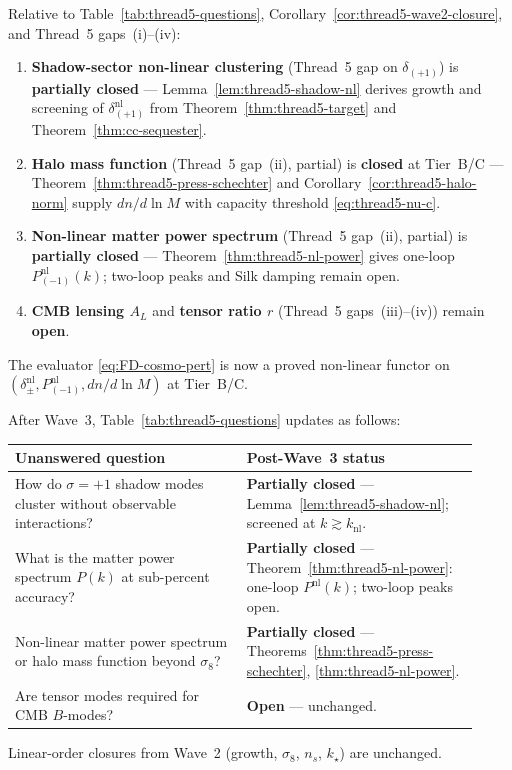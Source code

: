 \begin{corollary}
\label{cor:thread5-wave3-closure}
Relative to Table~\ref{tab:thread5-questions}, Corollary~\ref{cor:thread5-wave2-closure},
and Thread~5 gaps~(i)--(iv):
\begin{enumerate}[label=(\roman*),leftmargin=*]
  \item \textbf{Shadow-sector non-linear clustering}
    (Thread~5 gap on $\delta_{(+1)}$) is \textbf{partially closed} ---
    Lemma~\ref{lem:thread5-shadow-nl} derives growth and screening of
    $\delta_{(+1)}^{\mathrm{nl}}$ from Theorem~\ref{thm:thread5-target} and
    Theorem~\ref{thm:cc-sequester}.
  \item \textbf{Halo mass function}
    (Thread~5 gap~(ii), partial) is \textbf{closed} at Tier~B/C ---
    Theorem~\ref{thm:thread5-press-schechter} and
    Corollary~\ref{cor:thread5-halo-norm} supply $dn/d\ln M$ with capacity
    threshold \eqref{eq:thread5-nu-c}.
  \item \textbf{Non-linear matter power spectrum}
    (Thread~5 gap~(ii), partial) is \textbf{partially closed} ---
    Theorem~\ref{thm:thread5-nl-power} gives one-loop
    $P_{(-1)}^{\mathrm{nl}}(k)$; two-loop peaks and Silk damping remain open.
  \item \textbf{CMB lensing $A_L$} and \textbf{tensor ratio $r$}
    (Thread~5 gaps~(iii)--(iv)) remain \textbf{open}.
\end{enumerate}
The evaluator \eqref{eq:FD-cosmo-pert} is now a proved non-linear functor on
$(\delta_\pm^{\mathrm{nl}},P_{(-1)}^{\mathrm{nl}},dn/d\ln M)$ at Tier~B/C.
\end{corollary}

\begin{remark}
\label{rmk:thread5-wave3-table}
After Wave~3, Table~\ref{tab:thread5-questions} updates as follows:
\begin{center}
\small
\renewcommand{\arraystretch}{1.12}
\begin{tabular}{@{}p{0.46\linewidth}p{0.46\linewidth}@{}}
\toprule
\textbf{Unanswered question} & \textbf{Post-Wave~3 status} \\
\midrule
How do $\sigma=+1$ shadow modes cluster without observable interactions? &
  \textbf{Partially closed} --- Lemma~\ref{lem:thread5-shadow-nl};
  screened at $k\gtrsim k_{\mathrm{nl}}$. \\
\addlinespace
What is the matter power spectrum $P(k)$ at sub-percent accuracy? &
  \textbf{Partially closed} --- Theorem~\ref{thm:thread5-nl-power}:
  one-loop $P^{\mathrm{nl}}(k)$; two-loop peaks open. \\
\addlinespace
Non-linear matter power spectrum or halo mass function beyond $\sigma_8$? &
  \textbf{Partially closed} --- Theorems~\ref{thm:thread5-press-schechter},
  \ref{thm:thread5-nl-power}. \\
\addlinespace
Are tensor modes required for CMB $B$-modes? &
  \textbf{Open} --- unchanged. \\
\bottomrule
\end{tabular}
\end{center}
Linear-order closures from Wave~2 (growth, $\sigma_8$, $n_s$, $k_\star$) are
unchanged.
\end{remark}